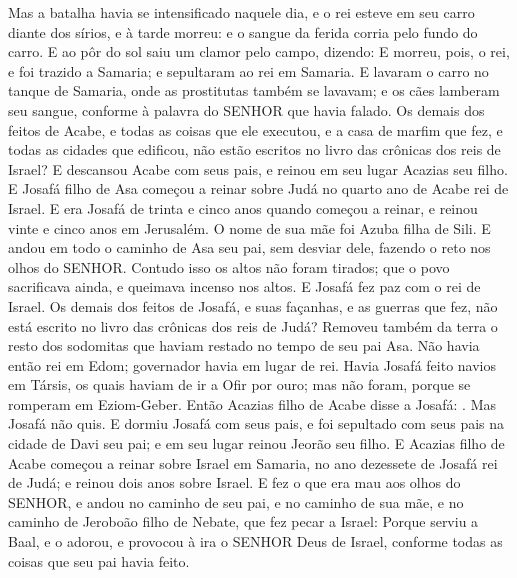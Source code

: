 {  Mas a batalha havia se intensificado naquele dia, e o rei esteve em seu carro diante dos sírios, e à tarde morreu: e o sangue da ferida corria pelo fundo do carro.
  E ao pôr do sol saiu um clamor pelo campo, dizendo: 
  E morreu, pois, o rei, e foi trazido a Samaria; e sepultaram ao rei em Samaria.
  E lavaram o carro no tanque de Samaria, onde as prostitutas também se lavavam; e os cães lamberam seu sangue, conforme à palavra do SENHOR que havia falado.
  Os demais dos feitos de Acabe, e todas as coisas que ele executou, e a casa de marfim que fez, e todas as cidades que edificou, não estão escritos no livro das crônicas dos reis de Israel?
  E descansou Acabe com seus pais, e reinou em seu lugar Acazias seu filho.
  E Josafá filho de Asa começou a reinar sobre Judá no quarto ano de Acabe rei de Israel.
  E era Josafá de trinta e cinco anos quando começou a reinar, e reinou vinte e cinco anos em Jerusalém. O nome de sua mãe foi Azuba filha de Sili.
  E andou em todo o caminho de Asa seu pai, sem desviar dele, fazendo o reto nos olhos do SENHOR. Contudo isso os altos não foram tirados; que o povo sacrificava ainda, e queimava incenso nos altos.
  E Josafá fez paz com o rei de Israel.
  Os demais dos feitos de Josafá, e suas façanhas, e as guerras que fez, não está escrito no livro das crônicas dos reis de Judá?
  Removeu também da terra o resto dos sodomitas que haviam restado no tempo de seu pai Asa.
  Não havia então rei em Edom; governador havia em lugar de rei.
  Havia Josafá feito navios em Társis, os quais haviam de ir a Ofir por ouro; mas não foram, porque se romperam em Eziom-Geber.
  Então Acazias filho de Acabe disse a Josafá: . Mas Josafá não quis.
  E dormiu Josafá com seus pais, e foi sepultado com seus pais na cidade de Davi seu pai; e em seu lugar reinou Jeorão seu filho.
  E Acazias filho de Acabe começou a reinar sobre Israel em Samaria, no ano dezessete de Josafá rei de Judá; e reinou dois anos sobre Israel. %
  E fez o que era mau aos olhos do SENHOR, e andou no caminho de seu pai, e no caminho de sua mãe, e no caminho de Jeroboão filho de Nebate, que fez pecar a Israel:
  Porque serviu a Baal, e o adorou, e provocou à ira o SENHOR Deus de Israel, conforme todas as coisas que seu pai havia feito.
\par }

